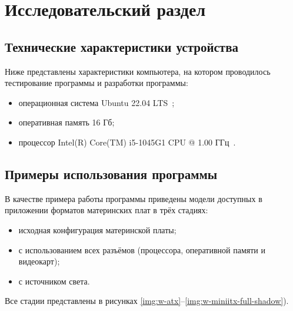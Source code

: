 \chapter{Исследовательский раздел}

\section{Технические характеристики устройства}

Ниже представлены характеристики компьютера, на котором проводилось тестирование программы и разработки программы:

\begin{itemize}[label=---]
    \item операционная система Ubuntu 22.04 LTS~\cite{ubuntu};
    \item оперативная память 16 Гб;
    \item процессор Intel(R) Core(TM) i5-1045G1 CPU @ 1.00 ГГц~\cite{intel}.
\end{itemize}

\section{Примеры использования программы}

В качестве примера работы программы приведены модели доступных в приложении форматов материнских плат в трёх стадиях:
\begin{itemize}[label=---]
	\item исходная конфигурация материнской платы;
	\item с использованием всех разъёмов (процессора, оперативной памяти и видеокарт);
	\item с источником света.
\end{itemize}
Все стадии представлены в рисунках \ref{img:w-atx}--\ref{img:w-miniitx-full-shadow}).

\clearpage

